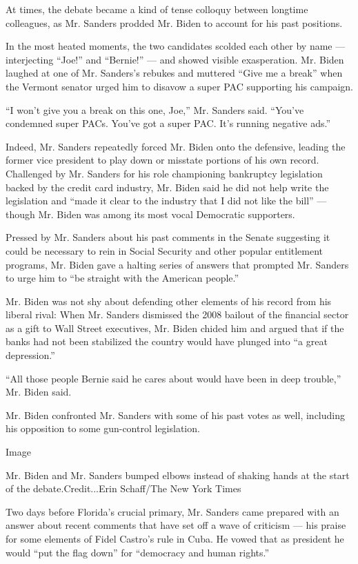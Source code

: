 At times, the debate became a kind of tense colloquy between longtime
colleagues, as Mr. Sanders prodded Mr. Biden to account for his past
positions.

In the most heated moments, the two candidates scolded each other by
name --- interjecting ``Joe!'' and ``Bernie!'' --- and showed visible
exasperation. Mr. Biden laughed at one of Mr. Sanders's rebukes and
muttered ``Give me a break'' when the Vermont senator urged him to
disavow a super PAC supporting his campaign.

``I won't give you a break on this one, Joe,'' Mr. Sanders said.
``You've condemned super PACs. You've got a super PAC. It's running
negative ads.''

Indeed, Mr. Sanders repeatedly forced Mr. Biden onto the defensive,
leading the former vice president to play down or misstate portions of
his own record. Challenged by Mr. Sanders for his role championing
bankruptcy legislation backed by the credit card industry, Mr. Biden
said he did not help write the legislation and ``made it clear to the
industry that I did not like the bill'' --- though Mr. Biden was among
its most vocal Democratic supporters.

Pressed by Mr. Sanders about his past comments in the Senate suggesting
it could be necessary to rein in Social Security and other popular
entitlement programs, Mr. Biden gave a halting series of answers that
prompted Mr. Sanders to urge him to ``be straight with the American
people.''

Mr. Biden was not shy about defending other elements of his record from
his liberal rival: When Mr. Sanders dismissed the 2008 bailout of the
financial sector as a gift to Wall Street executives, Mr. Biden chided
him and argued that if the banks had not been stabilized the country
would have plunged into ``a great depression.''

``All those people Bernie said he cares about would have been in deep
trouble,'' Mr. Biden said.

Mr. Biden confronted Mr. Sanders with some of his past votes as well,
including his opposition to some gun-control legislation.

Image

Mr. Biden and Mr. Sanders bumped elbows instead of shaking hands at the
start of the debate.Credit...Erin Schaff/The New York Times

Two days before Florida's crucial primary, Mr. Sanders came prepared
with an answer about recent comments that have set off a wave of
criticism --- his praise for some elements of Fidel Castro's rule in
Cuba. He vowed that as president he would ``put the flag down'' for
``democracy and human rights.''

